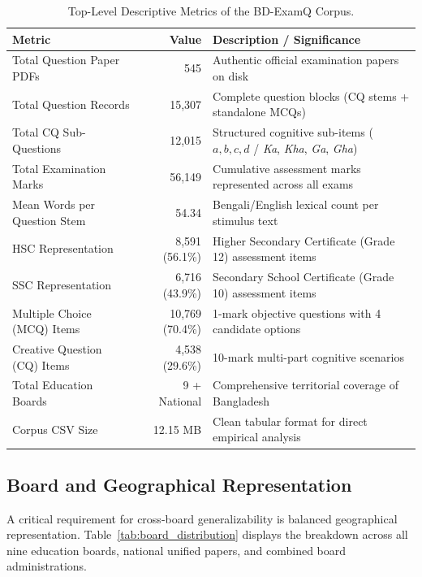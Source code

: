 \documentclass[11pt,a4paper]{article}
\begin{document}
\begin{table}[htbp]
\centering
\small
\caption{Top-Level Descriptive Metrics of the BD-ExamQ Corpus.}
\label{tab:overview}
\begin{tabularx}{\textwidth}{l r X}
\toprule
\textbf{Metric} & \textbf{Value} & \textbf{Description / Significance} \\
\midrule
Total Question Paper PDFs & 545 & Authentic official examination papers on disk \\
Total Question Records & 15,307 & Complete question blocks (CQ stems + standalone MCQs) \\
Total CQ Sub-Questions & 12,015 & Structured cognitive sub-items ($a, b, c, d$ / \textsl{Ka}, \textsl{Kha}, \textsl{Ga}, \textsl{Gha}) \\
Total Examination Marks & 56,149 & Cumulative assessment marks represented across all exams \\
Mean Words per Question Stem & 54.34 & Bengali/English lexical count per stimulus text \\
HSC Representation & 8,591 (56.1\%) & Higher Secondary Certificate (Grade 12) assessment items \\
SSC Representation & 6,716 (43.9\%) & Secondary School Certificate (Grade 10) assessment items \\
Multiple Choice (MCQ) Items & 10,769 (70.4\%) & 1-mark objective questions with 4 candidate options \\
Creative Question (CQ) Items & 4,538 (29.6\%) & 10-mark multi-part cognitive scenarios \\
Total Education Boards & 9 + National & Comprehensive territorial coverage of Bangladesh \\
Corpus CSV Size & 12.15 MB & Clean tabular format for direct empirical analysis \\
\bottomrule
\end{tabularx}
\end{table}

\subsection{Board and Geographical Representation}
A critical requirement for cross-board generalizability is balanced geographical representation. Table~\ref{tab:board_distribution} displays the breakdown across all nine education boards, national unified papers, and combined board administrations.
\end{document}
